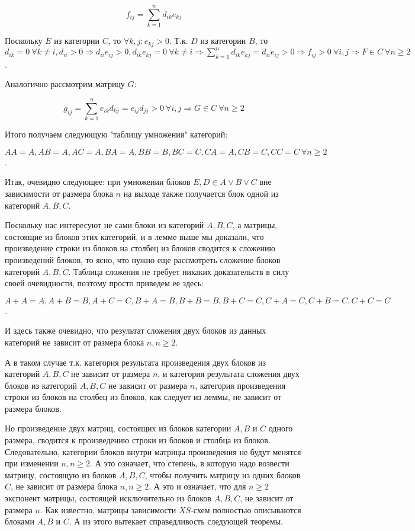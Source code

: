 \documentclass[a4paper,12pt]{report}
\theoremstyle{plain} %
\theoremstyle{definition}
\theoremstyle{remark}
\begin{document}
\begin{large}
$$f_{ij} = \sum_{k=1}^n d_{ik}e_{kj}$$

Поскольку $E$ из категории $C$, то $\forall k,j: e_{kj} > 0$. Т.к. $D$ из категории $B$, то $d_{ik} = 0~ \forall k \neq i, d_{ii} > 0 \Rightarrow d_{ii}e_{ij} > 0, d_{ik}e_{kj} = 0~ \forall k \neq i \Rightarrow \sum_{k=1}^n d_{ik}e_{kj} = d_{ii}e_{ij} > 0 \Rightarrow f_{ij} > 0~ \forall i,j \Rightarrow F \in C ~\forall n \geq 2$.

Аналогично рассмотрим матрицу $G$:

$$g_{ij} = \sum_{k=1}^n e_{ik}d_{kj} = e_{ij}d_{jj} > 0 ~\forall i,j \Rightarrow G \in C ~\forall n \geq 2$$

Итого получаем следующую "таблицу умножения" категорий:

$AA = A, AB = A, AC = A, BA = A, BB = B, BC = C, CA = A, CB = C, CC = C ~\forall n \geq 2$.

Итак, очевидно следующее: при умножении блоков $E,D \in A \vee B \vee C$ вне зависимости от размера блока $n$ на выходе также получается блок одной из категорий $A,B,C$.

Поскольку нас интересуют не сами блоки из категорий $A,B,C$, а матрицы, состоящие из блоков этих категорий, и в лемме выше мы доказали, что произведение строки из блоков на столбец из блоков сводится к сложению произведений блоков, то ясно, что нужно еще рассмотреть сложение блоков категорий $A,B,C$. Таблица сложения не требует никаких доказательств в силу своей очевидности, поэтому просто приведем ее здесь:

$A+A = A, A+B = B, A+C = C, B+A = B, B+B = B, B+C = C, C+A = C, C+B = C, C+C = C$.

И здесь также очевидно, что результат сложения двух блоков из данных категорий не зависит от размера блока $n, n \geq 2$.

А в таком случае т.к. категория результата произведения двух блоков из категорий $A,B,C$ не зависит от размера $n$, и категория результата сложения двух блоков из категорий $A,B,C$ не зависит от размера $n$, категория произведения строки из блоков на столбец из блоков, как следует из леммы, не зависит от размера блоков.

Но произведение двух матриц, состоящих из блоков категории $A, B$ и $C$ одного размера, сводится к произведению строки из блоков и столбца из блоков. Следовательно, категории блоков внутри матрицы произведения не будут менятся при изменении $n, n \geq 2$. А это означает, что степень, в которую надо возвести матрицу, состоящую из блоков $A,B,C$, чтобы получить матрицу из одних блоков $C$, не зависит от размера блока $n, n \geq 2$. А это и означает, что для $n \geq 2$ экспонент матрицы, состоящей исключительно из блоков $A,B,C$, не зависит от размера $n$. Как известно, матрицы зависимости $XS$-схем полностью описываются блоками $A, B$ и $C$. А из этого вытекает справедливость следующей теоремы.


\end{large}
\end{document}

